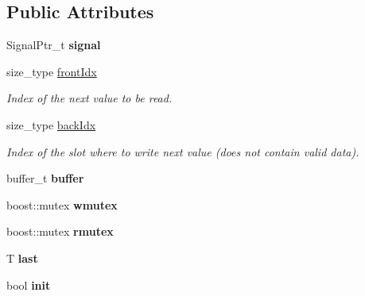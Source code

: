 \subsection*{Public Attributes}
\begin{DoxyCompactItemize}
\item 
\mbox{\label{structdynamic__graph_1_1internal_1_1BindedSignal_aa0b8c4e3dcea8585de50697b892ea0a4}} 
Signal\+Ptr\+\_\+t {\bfseries signal}
\item 
\mbox{\label{structdynamic__graph_1_1internal_1_1BindedSignal_af90b4e3d1f26e7525f51e0903c17a37f}} 
size\+\_\+type \hyperlink{structdynamic__graph_1_1internal_1_1BindedSignal_af90b4e3d1f26e7525f51e0903c17a37f}{front\+Idx}
\begin{DoxyCompactList}\small\item\em Index of the next value to be read. \end{DoxyCompactList}\item 
\mbox{\label{structdynamic__graph_1_1internal_1_1BindedSignal_a93b1cf4373c6271937f535a68334c523}} 
size\+\_\+type \hyperlink{structdynamic__graph_1_1internal_1_1BindedSignal_a93b1cf4373c6271937f535a68334c523}{back\+Idx}
\begin{DoxyCompactList}\small\item\em Index of the slot where to write next value (does not contain valid data). \end{DoxyCompactList}\item 
\mbox{\label{structdynamic__graph_1_1internal_1_1BindedSignal_aefa6f66d4def9aa5353335c035c1d716}} 
buffer\+\_\+t {\bfseries buffer}
\item 
\mbox{\label{structdynamic__graph_1_1internal_1_1BindedSignal_ad3b9957dafb9684643caacbdc2739c38}} 
boost\+::mutex {\bfseries wmutex}
\item 
\mbox{\label{structdynamic__graph_1_1internal_1_1BindedSignal_a25a7206b3a9904d4cccd226bd885e232}} 
boost\+::mutex {\bfseries rmutex}
\item 
\mbox{\label{structdynamic__graph_1_1internal_1_1BindedSignal_a23688c234ce0c8935ed3f52783fa9f2a}} 
T {\bfseries last}
\item 
\mbox{\label{structdynamic__graph_1_1internal_1_1BindedSignal_ac2169fa9a731a30f66805c53af7f55eb}} 
bool {\bfseries init}
\end{DoxyCompactItemize}


